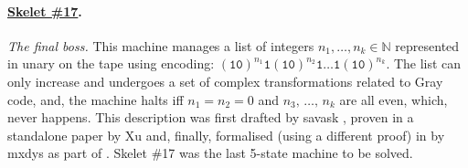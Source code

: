 \vspace{-0.5em}
\paragraph{\href{https://bbchallenge.org/1RB---_0LC1RE_0LD1LC_1RA1LB_0RB0RA}{Skelet \#17}.} \textit{The final boss.} This machine manages a list of integers $n_1, \dots, n_k \in \mathbb{N}$ represented in unary on the tape using encoding: $(\texttt{10})^{n_1} \texttt{1} (\texttt{10})^{n_2} \texttt{1} \dots \texttt{1} (\texttt{10})^{n_k}$. The list can only increase and undergoes a set of complex transformations related to Gray code, and, the machine halts iff $n_1 = n_2 = 0$ and $n_3,\, \dots,\, n_k$ are all even, which, never happens. This description was first drafted by savask \cite{savaskSk17}, proven in a standalone paper by Xu \cite{xu2024skelet17fifthbusy} and, finally, formalised (using a different proof) in \Coq by mxdys as part of \CoqBB. Skelet \#17 was the last 5-state machine to be solved.
